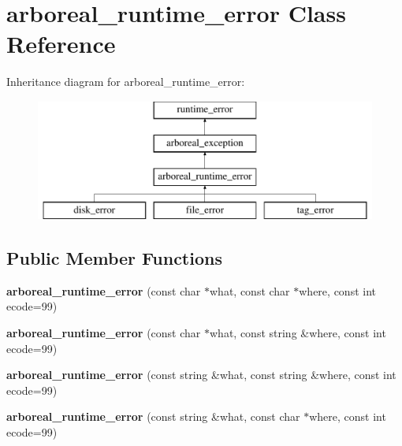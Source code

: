 \hypertarget{classarboreal__runtime__error}{}\section{arboreal\+\_\+runtime\+\_\+error Class Reference}
\label{classarboreal__runtime__error}
Inheritance diagram for arboreal\+\_\+runtime\+\_\+error\+:\begin{figure}[H]
\begin{center}
\leavevmode
\includegraphics[height=4.000000cm]{classarboreal__runtime__error}
\end{center}
\end{figure}
\subsection*{Public Member Functions}
\begin{DoxyCompactItemize}
\item 
\mbox{\label{classarboreal__runtime__error_aa6970966b569a105ead4fc6a5648cb5e}} 
{\bfseries arboreal\+\_\+runtime\+\_\+error} (const char $\ast$what, const char $\ast$where, const int ecode=99)
\item 
\mbox{\label{classarboreal__runtime__error_af20cdd8f990b40293bbbf11f3fe1005b}} 
{\bfseries arboreal\+\_\+runtime\+\_\+error} (const char $\ast$what, const string \&where, const int ecode=99)
\item 
\mbox{\label{classarboreal__runtime__error_a3797d6f9ba8c5590539b280042d023a5}} 
{\bfseries arboreal\+\_\+runtime\+\_\+error} (const string \&what, const string \&where, const int ecode=99)
\item 
\mbox{\label{classarboreal__runtime__error_a897b94adcbe8bdbcd8c7299d95c4e020}} 
{\bfseries arboreal\+\_\+runtime\+\_\+error} (const string \&what, const char $\ast$where, const int ecode=99)
\end{DoxyCompactItemize}

